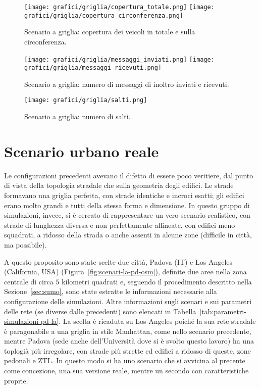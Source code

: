 %
\begin{figure}[htbp]
	\centering
		\texttt{[image: grafici/griglia/copertura\_totale.png]}
		\texttt{[image: grafici/griglia/copertura\_circonferenza.png]}
\caption{Scenario a griglia: copertura dei veicoli in totale e sulla circonferenza.\label{fig:risultati-griglia-copertura}}
\end{figure}
%
\begin{figure}[htbp]
	\centering
		\texttt{[image: grafici/griglia/messaggi\_inviati.png]}
		\texttt{[image: grafici/griglia/messaggi\_ricevuti.png]}
\caption{Scenario a griglia: numero di messaggi di inoltro inviati e ricevuti.\label{fig:risultati-griglia-messaggi}}
\end{figure}
%
\begin{figure}[htbp]
	\centering
		\texttt{[image: grafici/griglia/salti.png]}
\caption{Scenario a griglia: numero di salti.\label{fig:risultati-griglia-salti}}
\end{figure}
%
\clearpage
%
%
\section{Scenario urbano reale}\label{sec:configurazione-la-pd} %
Le configurazioni precedenti avevano il difetto di essere poco veritiere, dal punto di vista della topologia stradale
che sulla geometria degli edifici.
Le strade formavano una griglia perfetta, con strade identiche e incroci esatti;
gli edifici erano molto grandi e tutti della stessa forma e dimensione.
In questo gruppo di simulazioni, invece, si è cercato di rappresentare un vero scenario realistico,
con strade di lunghezza diversa e non perfettamente allineate,
con edifici meno squadrati, a ridosso della strada o anche assenti in alcune zone (difficile in città, ma possibile).

A questo proposito sono state scelte due città, Padova (IT) e Los Angeles (California, USA) (Figura~\ref{fig:scenari-la-pd-osm}), definite due aree nella zona centrale di circa $5$ kilometri quadrati
e, seguendo il procedimento descritto nella Sezione~\ref{sec:sumo}, sono state estratte le informazioni necessarie alla configurazione delle simulazioni.
Altre informazioni sugli scenari e sui parametri delle rete (se diverse dalle precedenti) sono elencati in Tabella~\ref{tab:parametri-simulazioni-pd-la}.
La scelta è ricaduta su Los Angeles poiché la sua rete stradale è paragonabile a una griglia in stile Manhattan, come nello scenario precedente,
mentre Padova (sede anche dell'Università dove si è svolto questo lavoro) ha una toplogià più irregolare, con strade più strette ed edifici a ridosso di queste,
zone pedonali e ZTL.
In questo modo si ha uno scenario che si avvicina al precente come concezione,
una sua versione reale, mentre un secondo con caratteristiche proprie.

